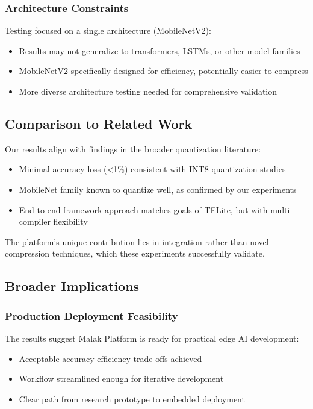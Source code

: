 \subsubsection{Architecture Constraints}
Testing focused on a single architecture (MobileNetV2):
\begin{itemize}
\item Results may not generalize to transformers, LSTMs, or other model families
\item MobileNetV2 specifically designed for efficiency, potentially easier to compress
\item More diverse architecture testing needed for comprehensive validation
\end{itemize}

\subsection{Comparison to Related Work}

Our results align with findings in the broader quantization literature:
\begin{itemize}
\item Minimal accuracy loss (<1\%) consistent with INT8 quantization studies
\item MobileNet family known to quantize well, as confirmed by our experiments
\item End-to-end framework approach matches goals of TFLite, but with multi-compiler flexibility
\end{itemize}

The platform's unique contribution lies in integration rather than novel compression techniques, which these experiments successfully validate.

\subsection{Broader Implications}

\subsubsection{Production Deployment Feasibility}
The results suggest Malak Platform is ready for practical edge AI development:
\begin{itemize}
\item Acceptable accuracy-efficiency trade-offs achieved
\item Workflow streamlined enough for iterative development
\item Clear path from research prototype to embedded deployment
\end{itemize}

